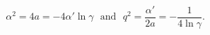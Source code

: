 \begin{equation}
\alpha^2=4a=-4\alpha'\ln \gamma  ~~~\mbox {and}~~~
q^2=\frac{\alpha'}{2a}=-\frac{1}{4\ln \gamma}.
\end{equation}

